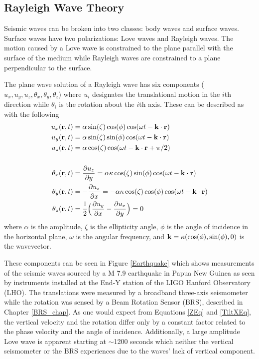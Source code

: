 \documentclass [12pt, proquest]{uwthesis}[2019]
\begin{document}
\subsection{Rayleigh Wave Theory}

Seismic waves can be broken into two classes: body waves and surface waves. Surface waves have two polarizations: Love waves and Rayleigh waves. The motion caused by a Love wave is constrained to the plane parallel with the surface of the medium while Rayleigh waves are constrained to a plane perpendicular to the surface. 

The plane wave solution of a Rayleigh wave has six components ($u_x, u_y, u_z, \theta_x, \theta_y, \theta_z$) where $u_i$ designates the translational motion in the $i$th direction while $\theta_i$ is the rotation about the $i$th axis.
These can be described as with the following~\cite{seismic}
\begin{align}
u_x({\bf r} ,t)&=\alpha \sin(\zeta) \cos(\phi) \cos(\omega t-{\bf k}\cdot{\bf r})\label{XEq}\\
u_y({\bf r} ,t)&=\alpha \sin(\zeta) \sin(\phi) \cos(\omega t-{\bf k}\cdot{\bf r})\\
u_z({\bf r} ,t)&=\alpha \cos(\zeta) \cos(\omega t-{\bf k}\cdot{\bf r}+\pi/2)\label{ZEq}\\
\notag \\
\theta_x({\bf r} ,t)&=\frac{\partial u_z}{\partial y}=\alpha \kappa \cos(\zeta) \sin(\phi) \cos(\omega t-{\bf k}\cdot{\bf r})\label{TiltXEq}\\
\theta_y({\bf r} ,t)&=-\frac{\partial u_z}{\partial x}=-\alpha \kappa \cos(\zeta) \cos(\phi) \cos(\omega t-{\bf k}\cdot{\bf r})\\
\theta_z({\bf r} ,t)&=\frac{1}{2}\Big(\frac{\partial u_y}{\partial x}-\frac{\partial u_x}{\partial y}\Big)=0
\end{align}
where $\alpha$ is the amplitude, $\zeta$ is the ellipticity angle, $\phi$ is the angle of incidence in the horizontal plane, $\omega$ is the angular frequency, and $\bf{k}=\kappa (\cos(\phi),\sin(\phi),\text{0})$ is the wavevector.

These components can be seen in Figure \ref{Earthquake} which shows measurements of the seismic waves sourced by a M 7.9 earthquake in Papua New Guinea as seen by instruments installed at the End-Y station of the LIGO Hanford Observatory (LHO). The translations were measured by a broadband three-axis seismometer while the rotation was sensed by a Beam Rotation Sensor (BRS), described in Chapter \ref{BRS_chap}. As one would expect from Equations \ref{ZEq} and \ref{TiltXEq}, the vertical velocity and the rotation differ only by a constant factor related to the phase velocity and the angle of incidence. Additionally, a large amplitude Love wave is apparent starting at $\sim$1200 seconds which neither the vertical seismometer or the BRS experiences due to the waves' lack of vertical component.
\end{document}
